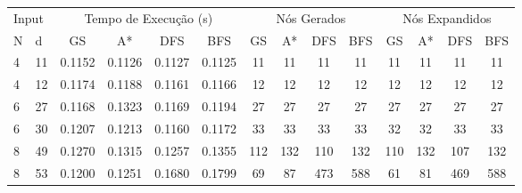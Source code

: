 \documentclass[12pt,a4paper]{article}
\begin{document}
\begin{adjustbox}{width={\textwidth}, totalheight={\textheight}, keepaspectratio}
  \begin{tabular}{ll cccc cccc cccc}
    \toprule
    \multicolumn{2}{l}{Input} & \multicolumn{4}{c}{Tempo de Execução (s)} & \multicolumn{4}{c}{Nós Gerados} & \multicolumn{4}{c}{Nós Expandidos}                                                                                   \\
    \cmidrule(lr){1-2} \cmidrule(lr){3-6} \cmidrule(lr){7-10} \cmidrule(lr){11-14}
    N                         & d                                         & GS                              & A*                                 & DFS    & BFS    & GS    & A*    & DFS   & BFS   & GS    & A*    & DFS   & BFS   \\
    \midrule
    4                         & 11                                        & 0.1152                          & 0.1126                             & 0.1127 & 0.1125 & 11    & 11    & 11    & 11    & 11    & 11    & 11    & 11    \\
    4                         & 12                                        & 0.1174                          & 0.1188                             & 0.1161 & 0.1166 & 12    & 12    & 12    & 12    & 12    & 12    & 12    & 12    \\
    6                         & 27                                        & 0.1168                          & 0.1323                             & 0.1169 & 0.1194 & 27    & 27    & 27    & 27    & 27    & 27    & 27    & 27    \\
    6                         & 30                                        & 0.1207                          & 0.1213                             & 0.1160 & 0.1172 & 33    & 33    & 33    & 33    & 32    & 32    & 33    & 33    \\
    8                         & 49                                        & 0.1270                          & 0.1315                             & 0.1257 & 0.1355 & 112   & 132   & 110   & 132   & 110   & 132   & 107   & 132   \\
    8                         & 53                                        & 0.1200                          & 0.1251                             & 0.1680 & 0.1799 & 69    & 87    & 473   & 588   & 61    & 81    & 469   & 588   \\

\end{tabular}
\end{adjustbox}
\end{document}

